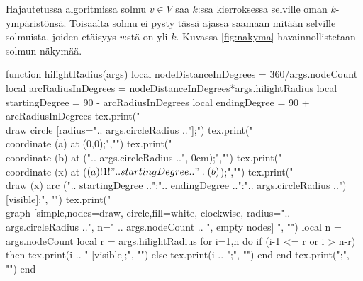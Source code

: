 \documentclass[finnish]{tktltiki2}
\theoremstyle{definition}
\theoremstyle{remark}
\begin{document}
Hajautetussa algoritmissa solmu $v \in V$ saa $k$:ssa kierroksessa selville
oman $k$-ympäristönsä. Toisaalta solmu ei pysty tässä ajassa saamaan mitään
selville solmuista, joiden etäisyys $v$:stä on yli $k$. Kuvassa
\ref{fig:nakyma} havainnollistetaan solmun näkymää.

\begin{luacode*}
    function hilightRadius(args)
        local nodeDistanceInDegrees = 360/args.nodeCount
        local arcRadiusInDegrees = nodeDistanceInDegrees*args.hilightRadius
        local startingDegree = 90 - arcRadiusInDegrees
        local endingDegree = 90 + arcRadiusInDegrees
        tex.print("\\draw circle [radius=".. args.circleRadius .."];")
        tex.print("\\coordinate (a) at (0,0);","")
        tex.print("\\coordinate (b) at (".. args.circleRadius ..", 0cm);","")
        tex.print("\\coordinate (x) at ($ (a)!1!".. startingDegree ..":(b)$);","")
        tex.print("\\draw (x) arc (".. startingDegree ..":".. endingDegree ..":".. args.circleRadius ..") [visible];", "")
        tex.print("\\graph [simple,nodes={draw, circle,fill=white}, clockwise, radius=".. args.circleRadius ..", n=" .. args.nodeCount .. ", empty nodes] {", "")
        local n = args.nodeCount
        local r = args.hilightRadius
        for i=1,n do
            if (i-1 <= r or i > n-r) then
                tex.print(i .. " [visible];", "")
            else
                tex.print(i .. ";", "")
            end
        end
        tex.print("};", "")
    end
\end{luacode*}

\newcommand*\hilightRadius[1][]{
    \pgfkeys{/aine,
             /circle radius/.default=1.5cm,
             /hilight radius/.value required,
             /node count/.value required,
             #1}

    \luadirect{hilightRadius{circleRadius="\circleradius",
                             hilightRadius=\hilightradius,
                             nodeCount=\nodecount}}
}
\end{document}
